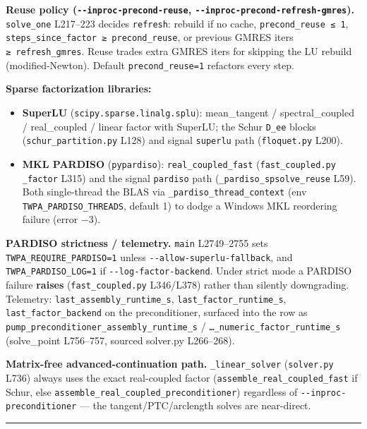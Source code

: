 \documentclass[
  10pt,
]{article}
\providecommand{\tightlist}{%
  \setlength{\itemsep}{0pt}\setlength{\parskip}{0pt}}
\begin{document}
\textbf{Reuse policy (\texttt{-\/-inproc-precond-reuse},
\texttt{-\/-inproc-precond-refresh-gmres}).} \texttt{solve\_one}
L217--223 decides \texttt{refresh}: rebuild if no cache,
\texttt{precond\_reuse\ ≤\ 1},
\texttt{steps\_since\_factor\ ≥\ precond\_reuse}, or previous GMRES
iters \texttt{≥\ refresh\_gmres}. Reuse trades extra GMRES iters for
skipping the LU rebuild (modified-Newton). Default
\texttt{precond\_reuse=1} refactors every step.

\textbf{Sparse factorization libraries:}

\begin{itemize}
\tightlist
\item
  \textbf{SuperLU} (\texttt{scipy.sparse.linalg.splu}): mean\_tangent /
  spectral\_coupled / real\_coupled / linear factor with SuperLU; the
  Schur \texttt{D\_ee} blocks (\texttt{schur\_partition.py} L128) and
  signal \texttt{superlu} path (\texttt{floquet.py} L200).
\item
  \textbf{MKL PARDISO} (\texttt{pypardiso}):
  \texttt{real\_coupled\_fast} (\texttt{fast\_coupled.py}
  \texttt{\_factor} L315) and the signal \texttt{pardiso} path
  (\texttt{\_pardiso\_spsolve\_reuse} L59). Both single-thread the BLAS
  via \texttt{\_pardiso\_thread\_context} (env
  \texttt{TWPA\_PARDISO\_THREADS}, default 1) to dodge a Windows MKL
  reordering failure (error −3).
\end{itemize}

\textbf{PARDISO strictness / telemetry.} \texttt{main} L2749--2755 sets
\texttt{TWPA\_REQUIRE\_PARDISO=1} unless
\texttt{-\/-allow-superlu-fallback}, and \texttt{TWPA\_PARDISO\_LOG=1}
if \texttt{-\/-log-factor-backend}. Under strict mode a PARDISO failure
\textbf{raises} (\texttt{fast\_coupled.py} L346/L378) rather than
silently downgrading. Telemetry: \texttt{last\_assembly\_runtime\_s},
\texttt{last\_factor\_runtime\_s}, \texttt{last\_factor\_backend} on the
preconditioner, surfaced into the row as
\texttt{pump\_preconditioner\_assembly\_runtime\_s} /
\texttt{…\_numeric\_factor\_runtime\_s} (solve\_point L756--757, sourced
solver.py L266--268).

\textbf{Matrix-free advanced-continuation path.}
\texttt{\_linear\_solver} (\texttt{solver.py} L736) always uses the
exact real-coupled factor (\texttt{assemble\_real\_coupled\_fast} if
Schur, else \texttt{assemble\_real\_coupled\_preconditioner}) regardless
of \texttt{-\/-inproc-preconditioner} --- the tangent/PTC/arclength
solves are near-direct.

\begin{center}\rule{0.5\linewidth}{0.5pt}\end{center}
\end{document}
